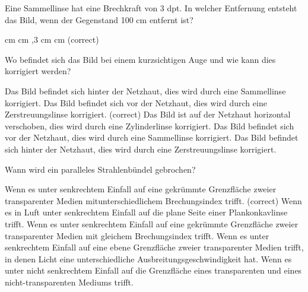 \documentclass[11pt]{exam}
\begin{document}
\setlength{\voffset}{-0.5in}
\setlength{\headsep}{5pt}

\hspace{2mm}
 \hspace{5mm}
\vspace{4mm}

\begin{questions}

\question Eine Sammellinse hat eine Brechkraft von 3 dpt. In welcher Entfernung entsteht das Bild, wenn der Gegenstand 100 cm entfernt ist?

\begin{choices}
	 cm
	 cm
	\choice 150cm
	,3 cm
	 cm (correct)
\end{choices}

\vspace{3mm}\question Wo befindet sich das Bild bei einem kurzsichtigen Auge und wie kann dies korrigiert werden?

\begin{choices}
	\choice Das Bild befindet sich hinter der Netzhaut, dies wird durch eine Sammellinse korrigiert.
	\choice Das Bild befindet sich vor der Netzhaut, dies wird durch eine Zerstreuungslinse korrigiert. (correct)
	\choice Das Bild ist auf der Netzhaut horizontal verschoben, dies wird durch eine Zylinderlinse korrigiert.
	\choice Das Bild befindet sich vor der Netzhaut, dies wird durch eine Sammellinse korrigiert.
	\choice Das Bild befindet sich hinter der Netzhaut, dies wird durch eine Zerstreuungslinse korrigiert.
\end{choices}

\vspace{3mm}\question Wann wird ein paralleles Strahlenbündel gebrochen?

\begin{choices}
	\choice Wenn es unter senkrechtem Einfall auf eine gekrümmte Grenzfläche zweier transparenter Medien mitunterschiedlichem Brechungsindex trifft. (correct)
	\choice Wenn es in Luft unter senkrechtem Einfall auf die plane Seite einer Plankonkavlinse trifft.
	\choice Wenn es unter senkrechtem Einfall auf eine gekrümmte Grenzfläche zweier transparenter Medien mit gleichem Brechungsindex trifft.
	\choice Wenn es unter senkrechtem Einfall auf eine ebene Grenzfläche zweier transparenter Medien trifft, in denen Licht eine unterschiedliche Ausbreitungsgeschwindigkeit hat.
	\choice Wenn es unter nicht senkrechtem Einfall auf die Grenzfläche eines transparenten und eines nicht-transparenten Mediums trifft.
\end{choices}


\end{questions}
\end{document}
